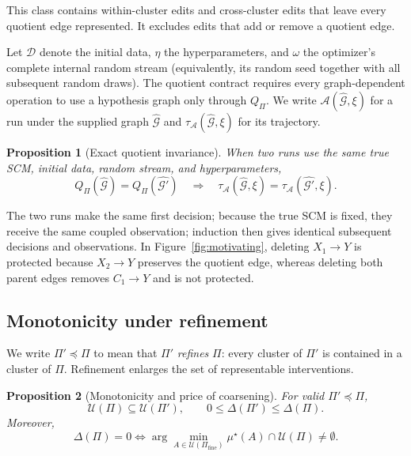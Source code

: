 \documentclass[twoside]{article}
\newtheorem{proposition}{Proposition}
\begin{document}
This class contains within-cluster edits and cross-cluster edits that leave every quotient edge represented. It excludes edits that add or remove a quotient edge.

Let $\mathcal D$ denote the initial data, $\eta$ the hyperparameters, and $\omega$ the optimizer's complete internal random stream (equivalently, its random seed together with all subsequent random draws). The quotient contract requires every graph-dependent operation to use a hypothesis graph only through $Q_\Pi$. We write $\mathcal A(\widehat{\mathcal G},\xi)$ for a run under the supplied graph $\widehat{\mathcal G}$ and $\tau_{\mathcal A}(\widehat{\mathcal G},\xi)$ for its trajectory. 



\begin{proposition}[Exact quotient invariance]
\label{prop:contract}
When two runs use the same true SCM, initial data, random stream, and
hyperparameters,
\[
  Q_\Pi(\widehat{\mathcal G})=Q_\Pi(\widehat{\mathcal G'})
  \quad\Longrightarrow\quad
  \tau_{\mathcal A}(\widehat{\mathcal G},\xi)
  =
  \tau_{\mathcal A}(\widehat{\mathcal G'}, \xi).
\]
\end{proposition}

The two runs make the same first decision; because the true SCM is fixed, they receive the same coupled observation; induction then gives identical subsequent decisions and observations. In Figure~\ref{fig:motivating}, deleting $X_1\to Y$ is protected because $X_2\to Y$ preserves the quotient edge, whereas deleting both parent edges removes $C_1\to Y$ and is not protected.

\subsection{Monotonicity under refinement}
\label{sec:price}

We write $\Pi'\preceq\Pi$ to mean that $\Pi'$ \emph{refines} $\Pi$: every cluster of $\Pi'$ is contained in a cluster of $\Pi$. Refinement enlarges the set of representable interventions.

\begin{proposition}[Monotonicity and price of coarsening]
\label{prop:price}
For valid $\Pi'\preceq\Pi$,
\[
 \mathcal U(\Pi)\subseteq\mathcal U(\Pi'),
 \qquad
 0\le\Delta(\Pi')\le\Delta(\Pi).
\]
Moreover,
\[
 \Delta(\Pi)=0
 \iff
 \arg\min_{A\in\mathcal U(\Pi_{\mathrm{fine}})}\mu^\star(A)
 \cap\mathcal U(\Pi)\ne\emptyset.
\]
\end{proposition}
\end{document}
